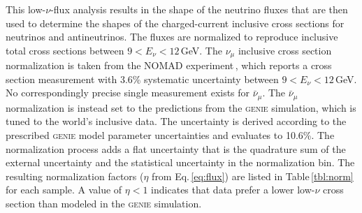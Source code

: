 \documentclass[%
reprint,
% 
superscriptaddress,
showpacs,
preprintnumbers,
showkeys,
nofootinbib,
 amsmath,amssymb,
 aps,
 prd,
floatfix,
]{revtex4-1}
\newcommand\numu     {$\nu_{\mu}$\xspace}
\newcommand\numubar  {$\bar{\nu}_{\mu}$\xspace}
\newcommand\lownu    {low-$\nu$\xspace}
\newcommand\GENIE  {\textsc{genie}\xspace}
\begin{document}
This \lownu-flux analysis results in the shape of the neutrino fluxes that are then used to determine the shapes of the charged-current inclusive cross sections for neutrinos and antineutrinos. The fluxes are normalized to reproduce inclusive total cross sections between $9<E_\nu<12$\,GeV. The \numu inclusive cross section normalization is taken from the NOMAD experiment\,\cite{NOMAD-xsec}, which reports a cross section measurement with 3.6\% systematic uncertainty between $9<E_\nu<12$\,GeV. No correspondingly precise single measurement exists for \numubar. The \numubar normalization is instead set to the predictions from the \GENIE simulation, which is tuned to the world's inclusive data. The uncertainty is derived according to the prescribed \GENIE model parameter uncertainties and evaluates to 10.6\%. The normalization process adds a flat uncertainty that is the quadrature sum of the external uncertainty and the statistical uncertainty in the normalization bin. The resulting normalization factors ($\eta$ from Eq.\,\ref{eq:flux}) are listed in Table\,\ref{tbl:norm} for each sample. A value of $\eta < 1$ indicates that data prefer a lower \lownu cross section than modeled in the \GENIE simulation. 
\end{document}
